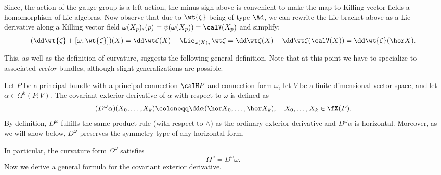 Since, the action of the gauge group is a left action, the minus sign above is convenient to make the map to Killing vector fields a homomorphism of Lie algebras. Now observe that due to $\wt{\zeta}$ being of type $\Ad$, we can rewrite the Lie bracket above as a Lie derivative along a Killing vector field $\omega(X_p)_\ast(p)=\psi(\omega(X_p))=\calV(X_p)$ and simplify:
\[(\dd\wt{\zeta}+[\omega,\wt{\zeta}])(X)=
\dd\wt\zeta(X)-\Lie_{\omega(X)_\ast}\wt\zeta=
\dd\wt\zeta(X)-\dd\wt\zeta(\calV(X))=\dd\wt{\zeta}(\hor X).\label{eq 4791793}\]

This, as well as the definition of curvature, suggests the following general definition. Note that at this point we have to specialize to associated \emph{vector} bundles, although slight generalizations are possible.

\begin{defn}
    Let $P$ be a principal bundle with a principal connection $\calH P$ and connection form $\omega$, let $V$ be a finite-dimensional vector space, and let $\alpha\in\Omega^k(P;V)$. The covariant exterior derivative of $\alpha$ with respect to $\omega$ is defined as
    \[(D^\omega \alpha)(X_0,\ldots,X_k)\coloneqq \dd\alpha(\hor X_0,\ldots,\hor X_k),\quad X_0,\ldots,X_k\in\fX(P).\]
    By definition, $D^\omega$ fulfills the same product rule (with respect to $\wedge$) as the ordinary exterior derivative and $D^\omega \alpha$ is horizontal. Moreover, as we will show below, $D^\omega$ preserves the symmetry type of any horizontal form.
\end{defn}

In particular, the curvature form $\Omega^\omega$ satisfies 
\[\Omega^\omega=D^\omega\omega.\]
Now we derive a general formula for the covariant exterior derivative.

